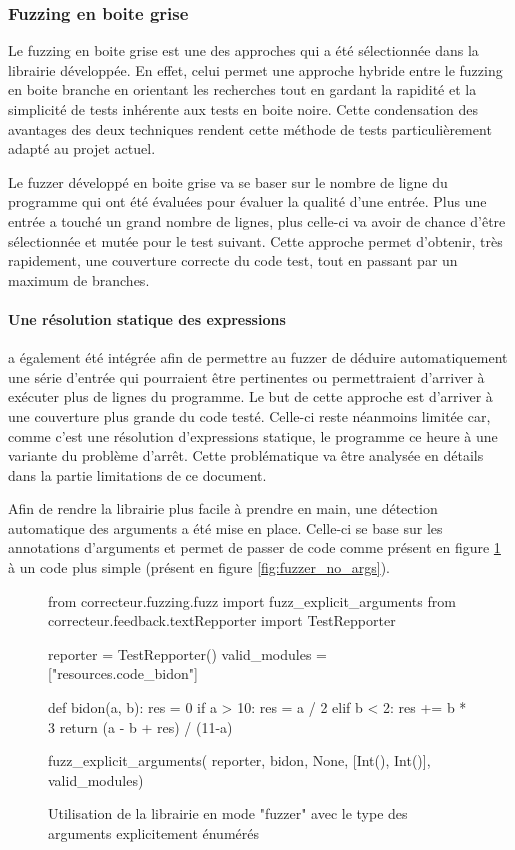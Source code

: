 \documentclass[a4paper]{report}
\begin{document}
\subsubsection{Fuzzing en boite grise}

Le fuzzing en boite grise est une des approches qui a été sélectionnée dans la librairie développée.
En effet, celui permet une approche hybride entre le fuzzing en boite branche en orientant les recherches tout en gardant la rapidité et la simplicité de tests inhérente aux tests en boite noire.
Cette condensation des avantages des deux techniques rendent cette méthode de tests particulièrement adapté au projet actuel.

Le fuzzer développé en boite grise va se baser sur le nombre de ligne du programme qui ont été évaluées pour évaluer la qualité d'une entrée.
Plus une entrée a touché un grand nombre de lignes, plus celle-ci va avoir de chance d'être sélectionnée et mutée  pour le test suivant.
Cette approche permet d'obtenir, très rapidement, une couverture correcte du code test, tout en passant par un maximum de branches.

\paragraph{Une résolution statique des expressions} a également été intégrée afin de permettre au fuzzer de déduire automatiquement une série d'entrée qui pourraient être pertinentes ou permettraient d'arriver à exécuter plus de lignes du programme.
Le but de cette approche est d'arriver à une couverture plus grande du code testé.
Celle-ci reste néanmoins limitée car, comme c'est une résolution d'expressions statique, le programme ce heure à une variante du problème d'arrêt.
Cette problématique va être analysée en détails dans la partie limitations de ce document.

Afin de rendre la librairie plus facile à prendre en main, une détection automatique des arguments a été mise en place.
Celle-ci se base sur les annotations d’arguments et permet de passer de code comme présent en figure \ref{fig:fuzzer_args} à un code plus simple (présent en figure \ref{fig:fuzzer_no_args}).


\begin{figure}[ht]
\begin{python}
from correcteur.fuzzing.fuzz import fuzz_explicit_arguments
from correcteur.feedback.textRepporter import TestRepporter


reporter = TestRepporter()
valid_modules = ["resources.code_bidon"]

def bidon(a, b):
    res = 0
    if a > 10:
        res = a / 2
    elif b < 2:
        res += b * 3
    return (a - b + res) / (11-a)


fuzz_explicit_arguments(
	reporter,
	bidon,
	None,
	[Int(), Int()],
	valid_modules)
\end{python}
	\caption{Utilisation de la librairie en mode "fuzzer" avec le type des arguments explicitement énumérés}
	
	\label{fig:fuzzer_args}
\end{figure}
\end{document}
